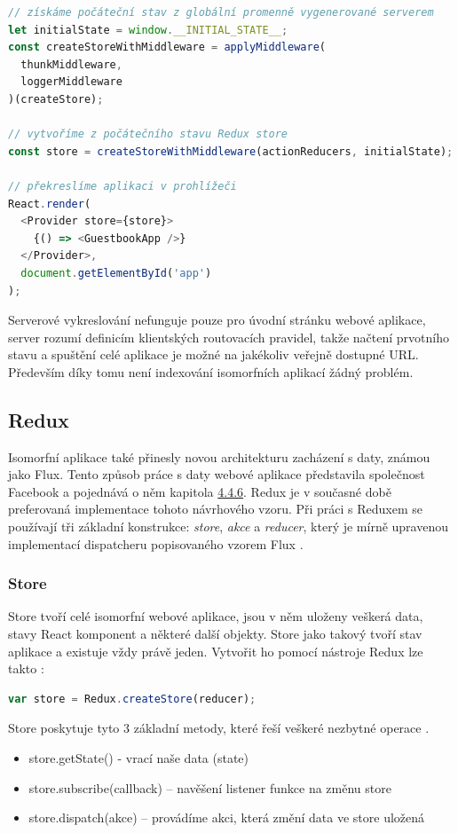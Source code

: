 \begin{lstlisting}[language=Javascript,caption={Ukázka získaní počátečního stavu aplikace z webového prohlížeče}]
// získáme počáteční stav z globální promenně vygenerované serverem
let initialState = window.__INITIAL_STATE__;
const createStoreWithMiddleware = applyMiddleware(  
  thunkMiddleware,
  loggerMiddleware
)(createStore);

// vytvoříme z počátečního stavu Redux store
const store = createStoreWithMiddleware(actionReducers, initialState);

// překreslíme aplikaci v prohlížeči
React.render(  
  <Provider store={store}>
    {() => <GuestbookApp />}
  </Provider>,
  document.getElementById('app')
);

\end{lstlisting}
Serverové vykreslování nefunguje pouze pro úvodní stránku webové aplikace, server rozumí definicím klientských routovacích pravidel, takže načtení prvotního stavu a spuštění celé aplikace je možné na jakékoliv veřejně dostupné URL. Především díky tomu není indexování isomorfních aplikací žádný problém.

\subsection{Redux}
Isomorfní aplikace také přinesly novou architekturu zacházení s daty, známou jako Flux. Tento způsob práce s daty webové aplikace představila společnost Facebook a pojednává o něm kapitola \hyperref[sec:flux]{4.4.6}. Redux je v současné době preferovaná implementace tohoto návrhového vzoru. Při práci s Reduxem se používají tři základní konstrukce: \textit{store}, \textit{akce} a \textit{reducer}, který je mírně upravenou implementací dispatcheru popisovaného vzorem Flux \cite{redux}.

\subsubsection{Store}
Store tvoří  celé isomorfní webové aplikace, jsou v něm uloženy veškerá data, stavy React komponent a některé další objekty. Store jako takový tvoří stav aplikace a existuje vždy právě jeden. Vytvořit ho pomocí nástroje Redux lze takto \cite{redux}:
\begin{lstlisting}[language=Javascript]
var store = Redux.createStore(reducer);
\end{lstlisting}

\vspace{3mm}
\noindent Store poskytuje tyto 3 základní metody, které řeší veškeré nezbytné operace \cite{redux}.
\begin{itemize}
\item store.getState() - vrací naše data (state)
\item store.subscribe(callback) – navěšení listener funkce na změnu store
\item store.dispatch(akce) – provádíme akci, která změní data ve store uložená
\end{itemize}

